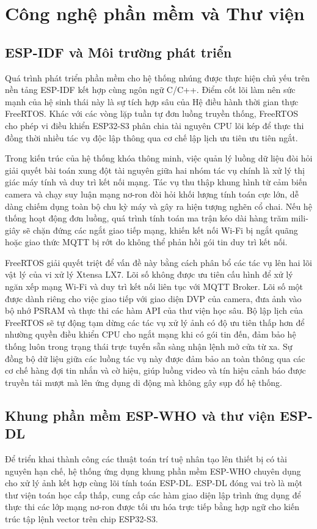 \section{Công nghệ phần mềm và Thư viện}

\subsection{ESP-IDF và Môi trường phát triển}
Quá trình phát triển phần mềm cho hệ thống nhúng được thực hiện chủ yếu trên nền tảng ESP-IDF kết hợp cùng ngôn ngữ C/C++. Điểm cốt lõi làm nên sức mạnh của hệ sinh thái này là sự tích hợp sâu của Hệ điều hành thời gian thực FreeRTOS. Khác với các vòng lặp tuần tự đơn luồng truyền thống, FreeRTOS cho phép vi điều khiển ESP32-S3 phân chia tài nguyên CPU lõi kép để thực thi đồng thời nhiều tác vụ độc lập thông qua cơ chế lập lịch ưu tiên ưu tiên ngắt.

Trong kiến trúc của hệ thống khóa thông minh, việc quản lý luồng dữ liệu đòi hỏi giải quyết bài toán xung đột tài nguyên giữa hai nhóm tác vụ chính là xử lý thị giác máy tính và duy trì kết nối mạng. Tác vụ thu thập khung hình từ cảm biến camera và chạy suy luận mạng nơ-ron đòi hỏi khối lượng tính toán cực lớn, dễ dàng chiếm dụng toàn bộ chu kỳ máy và gây ra hiện tượng nghẽn cổ chai. Nếu hệ thống hoạt động đơn luồng, quá trình tính toán ma trận kéo dài hàng trăm mili-giây sẽ chặn đứng các ngắt giao tiếp mạng, khiến kết nối Wi-Fi bị ngắt quãng hoặc giao thức MQTT bị rớt do không thể phản hồi gói tin duy trì kết nối.

FreeRTOS giải quyết triệt để vấn đề này bằng cách phân bổ các tác vụ lên hai lõi vật lý của vi xử lý Xtensa LX7. Lõi số không được ưu tiên cấu hình để xử lý ngăn xếp mạng Wi-Fi và duy trì kết nối liên tục với MQTT Broker. Lõi số một được dành riêng cho việc giao tiếp với giao diện DVP của camera, đưa ảnh vào bộ nhớ PSRAM và thực thi các hàm API của thư viện học sâu. Bộ lập lịch của FreeRTOS sẽ tự động tạm dừng các tác vụ xử lý ảnh có độ ưu tiên thấp hơn để nhường quyền điều khiển CPU cho ngắt mạng khi có gói tin đến, đảm bảo hệ thống luôn trong trạng thái trực tuyến sẵn sàng nhận lệnh mở cửa từ xa. Sự đồng bộ dữ liệu giữa các luồng tác vụ này được đảm bảo an toàn thông qua các cơ chế hàng đợi tin nhắn và cờ hiệu, giúp luồng video và tín hiệu cảnh báo được truyền tải mượt mà lên ứng dụng di động mà không gây sụp đổ hệ thống.

\subsection{Khung phần mềm ESP-WHO và thư viện ESP-DL}
Để triển khai thành công các thuật toán trí tuệ nhân tạo lên thiết bị có tài nguyên hạn chế, hệ thống ứng dụng khung phần mềm ESP-WHO chuyên dụng cho xử lý ảnh kết hợp cùng lõi tính toán ESP-DL. ESP-DL đóng vai trò là một thư viện toán học cấp thấp, cung cấp các hàm giao diện lập trình ứng dụng để thực thi các lớp mạng nơ-ron được tối ưu hóa trực tiếp bằng hợp ngữ cho kiến trúc tập lệnh vector trên chip ESP32-S3.

